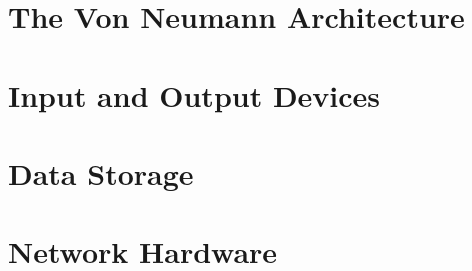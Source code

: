 \documentclass[../main.tex]{subfiles}
\begin{document}
\section{The Von Neumann Architecture}
\label{3:sec:von_neumann}


\section{Input and Output Devices}
\label{3:sec:input_and_output_devices}


\section{Data Storage}
\label{3:sec:data_storage}


\section{Network Hardware}
\label{3:sec:network_hardware}

\end{document}
